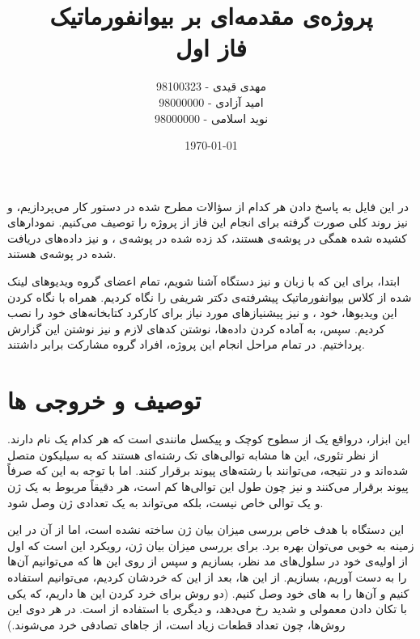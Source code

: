 \documentclass[12pt,onecolumn,a4paper]{article}
\begin{document}
\begin{titlepage}
\title{پروژه‌ی مقدمه‌ای بر بیوانفورماتیک \\ فاز اول} 
\author{مهدی قیدی - 98100323 \\ امید آزادی - 98000000 \\ نوید اسلامی - 98000000}
\date{\today}
\maketitle
\end{titlepage}

در این فایل به پاسخ دادن هر کدام از سؤالات مطرح شده در دستور کار می‌پردازیم، و نیز روند کلی صورت گرفته برای انجام این فاز از پروژه را توصیف می‌کنیم. نمودار‌های کشیده شده همگی در پوشه‌ی  هستند، کد زده شده در پوشه‌ی ، و نیز داده‌های دریافت شده در پوشه‌ی  هستند.

ابتدا، برای این که با زبان  و نیز دستگاه  آشنا شویم، تمام اعضای گروه ویدیوهای لینک شده از کلاس بیوانفورماتیک پیشرفته‌ی دکتر شریفی را نگاه کردیم. همراه با نگاه کردن این ویدیو‌ها، خود ،  و نیز پیشنیاز‌های مورد نیاز برای کارکرد کتابخانه‌های خود را نصب کردیم. سپس، به آماده کردن داده‌ها، نوشتن کد‌های لازم و نیز نوشتن این گزارش پرداختیم. در تمام مراحل انجام این پروژه، افراد گروه مشارکت برابر داشتند.

\section{توصیف و خروجی ها}
این ابزار، درواقع یک  از سطوح کوچک و پیکسل مانندی است که هر کدام یک  نام دارند. از نظر تئوری، این ها مشابه توالی‌های تک رشته‌ای  هستند که به سیلیکون متصل شده‌اند و در نتیجه، می‌توانند با رشته‌های  پیوند برقرار کنند. اما با توجه به این که صرفاً پیوند برقرار می‌کنند و نیز چون طول این توالی‌ها کم است، هر  دقیقاً مربوط به یک ژن و یک توالی خاص نیست، بلکه می‌تواند به یک تعدادی ژن وصل شود.

این دستگاه با هدف خاص بررسی میزان بیان ژن ساخته نشده است، اما از آن در این زمینه به خوبی می‌توان بهره برد. برای بررسی میزان بیان ژن، رویکرد این است که اول از  اولیه‌ی خود در سلول‌های مد نظر،  بسازیم و سپس از روی این ‌ها که می‌توانیم آن‌ها را به دست آوریم،  بسازیم. از این ها، بعد از این که خردشان کردیم، می‌توانیم استفاده کنیم و آن‌ها را به های خود وصل کنیم. (دو روش برای خرد کردن این ها داریم، که یکی با تکان دادن معمولی و شدید رخ می‌دهد، و دیگری با استفاده از  است. در هر دوی این روش‌ها، چون تعداد قطعات زیاد است، از جاهای تصادفی خرد می‌شوند.)
\end{document}
